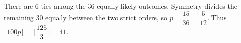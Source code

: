There are $6$ ties among the $36$ equally likely outcomes. Symmetry divides the remaining $30$ equally between the two strict orders, so $p=\dfrac{15}{36}=\dfrac{5}{12}$. Thus $\boxed{\lfloor100p\rfloor=\lfloor\dfrac{125}{3}\rfloor=41}$.
